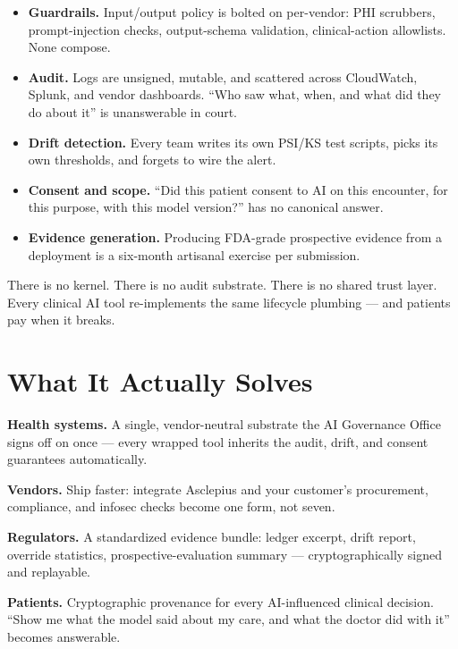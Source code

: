 \documentclass[11pt,a4paper]{article}
\begin{document}
\begin{itemize}[leftmargin=1.2em]
  \item \textbf{Guardrails.} Input/output policy is bolted on per-vendor: PHI scrubbers, prompt-injection checks, output-schema validation, clinical-action allowlists. None compose.
  \item \textbf{Audit.} Logs are unsigned, mutable, and scattered across CloudWatch, Splunk, and vendor dashboards. ``Who saw what, when, and what did they do about it'' is unanswerable in court.
  \item \textbf{Drift detection.} Every team writes its own PSI/KS test scripts, picks its own thresholds, and forgets to wire the alert.
  \item \textbf{Consent and scope.} ``Did this patient consent to AI on this encounter, for this purpose, with this model version?'' has no canonical answer.
  \item \textbf{Evidence generation.} Producing FDA-grade prospective evidence from a deployment is a six-month artisanal exercise per submission.
\end{itemize}

There is no kernel. There is no audit substrate. There is no shared trust layer. Every clinical AI tool re-implements the same lifecycle plumbing --- and patients pay when it breaks.

\section{What It Actually Solves}

\begin{callout}
\textbf{Health systems.} A single, vendor-neutral substrate the AI Governance Office signs off on once --- every wrapped tool inherits the audit, drift, and consent guarantees automatically.

\vspace{0.3em}
\textbf{Vendors.} Ship faster: integrate Asclepius and your customer's procurement, compliance, and infosec checks become one form, not seven.

\vspace{0.3em}
\textbf{Regulators.} A standardized evidence bundle: ledger excerpt, drift report, override statistics, prospective-evaluation summary --- cryptographically signed and replayable.

\vspace{0.3em}
\textbf{Patients.} Cryptographic provenance for every AI-influenced clinical decision. ``Show me what the model said about my care, and what the doctor did with it'' becomes answerable.
\end{callout}
\end{document}
